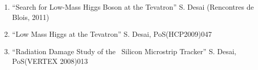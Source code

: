 \begin{enumerate}

\item  ``Search for Low-Mass Higgs Boson at the Tevatron'' {}
   S. Desai (Rencontres de Blois, 2011)
           
\item%
 ``Low Mass Higgs at the Tevatron'' {}
   S. Desai,
   PoS(HCP2009)047

\item%
 ``Radiation Damage Study of the \dzero\ Silicon Microstrip Tracker'' {}
   S. Desai,
   PoS(VERTEX 2008)013





\end{enumerate}
